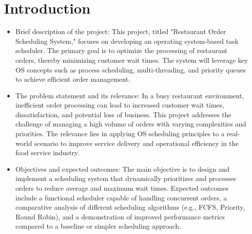 \documentclass[a4paper,12pt]{article}
\begin{document}
\section{Introduction}
\begin{itemize}
    \item Brief description of the project: This project, titled "Restaurant Order Scheduling System," focuses on developing an operating system-based task scheduler. The primary goal is to optimize the processing of restaurant orders, thereby minimizing customer wait times. The system will leverage key OS concepts such as process scheduling, multi-threading, and priority queues to achieve efficient order management.
    \item The problem statement and its relevance: In a busy restaurant environment, inefficient order processing can lead to increased customer wait times, dissatisfaction, and potential loss of business. This project addresses the challenge of managing a high volume of orders with varying complexities and priorities. The relevance lies in applying OS scheduling principles to a real-world scenario to improve service delivery and operational efficiency in the food service industry.
    \item Objectives and expected outcomes: The main objective is to design and implement a scheduling system that dynamically prioritizes and processes orders to reduce average and maximum wait times. Expected outcomes include a functional scheduler capable of handling concurrent orders, a comparative analysis of different scheduling algorithms (e.g., FCFS, Priority, Round Robin), and a demonstration of improved performance metrics compared to a baseline or simpler scheduling approach.
\end{itemize}
\newpage

\end{document}
